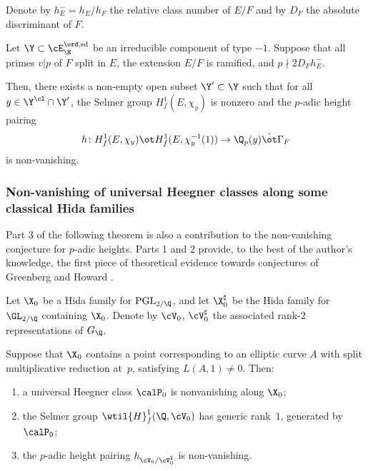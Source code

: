 Denote by $h_E^-=h_E/h_F$  the relative class number of $E/F$ and  by $D_{F}$ the absolute discriminant of $F$.

\begin{theoA}  
Let $\Y\subset \cE^{\ord, {\rm sd}}_{\H}$ be an irreducible component  of type $-1$.
Suppose that all primes $v\vert p$ of $F$ split in $E$,  the extension $E/F$ is ramified,  and $p \nmid 2 D_{F} h_E^-$.

Then, there  exists a non-empty open  subset $\Y'\subset \Y$ such that  for all $y\in \Y^{\cl}\cap \Y'$, the Selmer group $H^{1}_{f}({E}, \chi_{y})$ is nonzero and the $p$-adic height pairing
$$h\colon H^{1}_{f}({E}, \chi_{y})\ot H^{1}_{f}({E}, \chi_{y}^{-1}(1))\to \Q_{p}(y)\hat{\ot}\Gamma_{F}$$
is non-vanishing.
\end{theoA}













\subsubsection{Non-vanishing of universal  Heegner classes along some classical Hida families} Part 3 of the following theorem is also a contribution to the non-vanishing conjecture for $p$-adic heights. Parts 1 and 2 provide, to the best of the author's knowledge, the first piece of theoretical evidence towards conjectures of  Greenberg \cite{greenberg} and Howard \cite{howbig}.



\begin{theoA}  Let $\X_{0}$ be a Hida family for ${\rm PGL}_{2/\Q}$, and let $\X_{0}^{\sharp}$ be the Hida family for $\GL_{2/\Q}$ containing $\X_{0}$. Denote by $\cV_{0}$, $\cV_{0}^{\sharp}$ the associated rank-$2$ representations of $G_{\Q}$.

  Suppose that $\X_{0}$ contains a point corresponding to an elliptic curve $A$ with split multiplicative reduction at~$p$,  satisfying $L(A, 1)\neq 0$.
   Then:
\begin{enumerate}
\item a universal Heegner class  $\calP_{0}$ is nonvanishing along $\X_{0}$;
\item the Selmer group $\wtil{H}^{1}_{f}(\Q, \cV_{0})$ has generic rank~$1$, generated by $\calP_{0}$;
\item the $p$-adic height pairing $h_{\cV_{0}/\cV_{0}^{\sharp}} $ is non-vanishing.
\end{enumerate}
\end{theoA}



